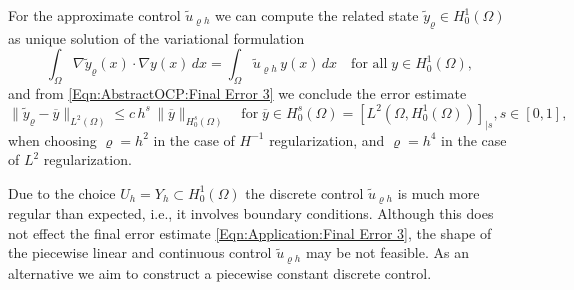 \documentclass{article}
\numberwithin{equation}{section}
\begin{document}
For the approximate control $\widetilde{u}_{\varrho h}$ we can compute
the related state $\widetilde{y}_\varrho \in H^1_0(\Omega)$ as unique
solution of the variational formulation
\[
  \int_\Omega \nabla \widetilde{y}_\varrho(x) \cdot \nabla y(x) \, dx =
  \int_\Omega \widetilde{u}_{\varrho h} \, y(x) \, dx \quad
  \mbox{for all} \; y \in H^1_0(\Omega),
\]
and from \eqref{Eqn:AbstractOCP:Final Error 3} we conclude the error estimate
\begin{equation}\label{Eqn:Application:Final Error 3}
  \| \widetilde{y}_\varrho - \overline{y} \|_{L^2(\Omega)} \leq
  c \, h^s \, \| \overline{y} \|_{H^s_0(\Omega)} \quad
  \mbox{for} \; \overline{y} \in H^s_0(\Omega) =
  [L^2(\Omega,H^1_0(\Omega))]_{|s}, s \in [0,1],
\end{equation}
when choosing $\varrho = h^2$ in the case of $H^{-1}$ regularization,
and $\varrho = h^4$ in the case of $L^2$ regularization.

Due to the choice $U_h = Y_h \subset H^1_0(\Omega)$ the discrete control
$\widetilde{u}_{\varrho h}$ is much more regular than expected, i.e., it
involves boundary conditions. Although this does not effect the final
error estimate \eqref{Eqn:Application:Final Error 3}, the shape of the
piecewise linear and continuous control $\widetilde{u}_{\varrho h}$ may be
not feasible. As an alternative we aim to construct a piecewise constant
discrete control.
\end{document}
